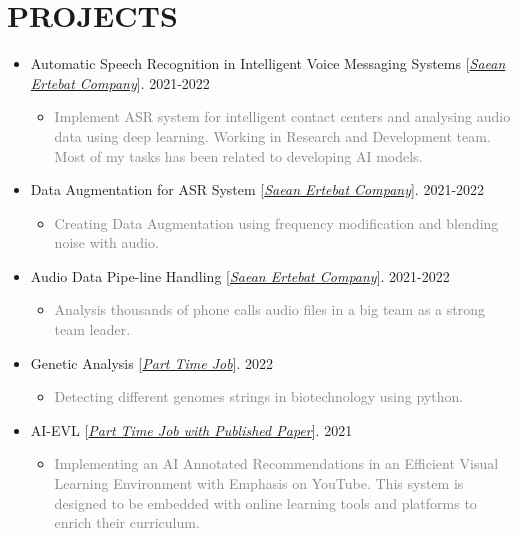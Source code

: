\documentclass[10pt,a4paper,sans]{moderncv} %
\begin{document}
	\section{PROJECTS}
	\vspace{0.3em}
	\begin{itemize}
		
		\item Automatic Speech Recognition in Intelligent Voice Messaging Systems  [\href{http://www.senatelecom.com/}{\emph{Saean Ertebat Company}}]. \hfill 2021-2022
		\begin{itemize}
			\item \textcolor{gray} {Implement ASR system for intelligent contact centers and analysing audio data using deep learning. Working in Research and Development team. Most of my tasks has been related to developing AI models.}
		\end{itemize}

		\item Data Augmentation for ASR System [\href{http://www.senatelecom.com/}{\emph{Saean Ertebat Company}}]. \hfill 2021-2022
		\begin{itemize}
			\item \textcolor{gray} {Creating Data Augmentation using frequency modification and blending noise with audio.}
		\end{itemize}

		\item Audio Data Pipe-line Handling [\href{http://www.senatelecom.com/}{\emph{Saean Ertebat Company}}]. \hfill 2021-2022
		\begin{itemize}
			\item \textcolor{gray} {Analysis thousands of phone calls audio files in a big team as a strong team leader.}
		\end{itemize}
		
		\item Genetic Analysis [\href{mailto:mbahmanabadi96@gmail.com}{\emph{Part Time Job}}]. \hfill 2022
		\begin{itemize}
			\item \textcolor{gray} {Detecting different genomes strings in biotechnology using python.}
		\end{itemize}

		\item AI-EVL [\href{https://arxiv.org/pdf/2203.11157.pdf}{\emph{Part Time Job with Published Paper}}]. \hfill 2021
		\begin{itemize}
			\item \textcolor{gray} {Implementing an AI Annotated Recommendations in an Efficient Visual Learning Environment with Emphasis on YouTube. This system is designed to be embedded with online learning tools and platforms to enrich their curriculum.}
		\end{itemize}
		

\end{itemize}
\end{document}
